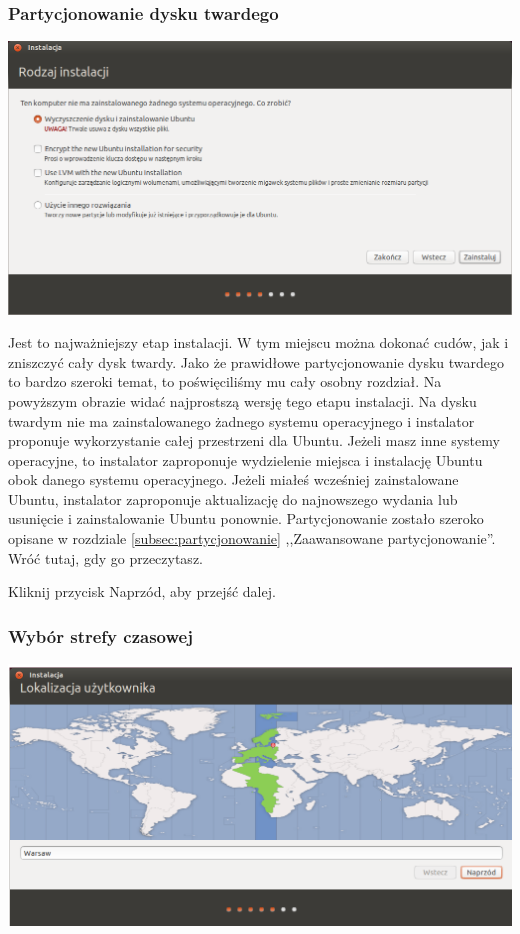 \subsubsection{Partycjonowanie dysku twardego}
\begin{center}
        \includegraphics[width=\linewidth]{images/instalator_partycjonowanie_proste.png}
\end{center}

Jest to najważniejszy etap instalacji. W tym miejscu można dokonać cudów, jak i zniszczyć cały dysk twardy. Jako że prawidłowe partycjonowanie dysku twardego to bardzo szeroki temat, to poświęciliśmy mu cały osobny rozdział. Na powyższym obrazie widać najprostszą wersję tego etapu instalacji. Na dysku twardym nie ma zainstalowanego żadnego systemu operacyjnego i instalator proponuje wykorzystanie całej przestrzeni dla Ubuntu. Jeżeli masz inne systemy operacyjne, to instalator zaproponuje wydzielenie miejsca i instalację Ubuntu obok danego systemu operacyjnego. Jeżeli miałeś wcześniej zainstalowane Ubuntu, instalator zaproponuje aktualizację do najnowszego wydania lub usunięcie i zainstalowanie Ubuntu ponownie.
Partycjonowanie zostało szeroko opisane w rozdziale \ref{subsec:partycjonowanie} ,,Zaawansowane partycjonowanie''. Wróć tutaj, gdy go przeczytasz.
\begin{flushright}
Kliknij przycisk \textcolor{ubuntu_orange}{Naprzód}, aby przejść dalej.
\end{flushright}
\clearpage
\subsubsection{Wybór strefy czasowej}
\label{instalator_strefa_czasowa}
\begin{center}
        \includegraphics[width=\linewidth]{images/instalator_czas.png}
\end{center}

